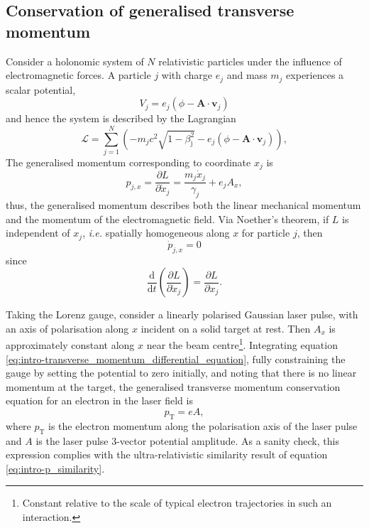 \subsection{Conservation of generalised transverse momentum}\label{sec:intro_conservation-generalised-mometum}
Consider a holonomic system of $N$ relativistic particles under the influence of electromagnetic forces. A particle $j$ with charge $e_j$ and mass $m_j$ experiences a scalar potential,
\begin{equation}
	V_{j} = e_j(\phi - \mathbf{A} \cdot \mathbf{v}_{j})
\end{equation}
and hence the system is described by the Lagrangian \cite{goldsteinClassicalMechanics2013}
\begin{equation}
	\mathcal{L} = \sum^N_{j=1}\left( - m_jc^2\sqrt{1-\beta^2_\mathrm{j}} - e_j(\phi - \mathbf{A} \cdot \mathbf{v}_j) \right),
\end{equation}
The generalised momentum corresponding to coordinate $x_j$ is
\begin{equation}
	p_{j,x} = \frac{\partial L}{\partial \dot{x}_j} = \frac{m_j\dot{x}_j }{\gamma_j}+ e_jA_x,
\end{equation}
thus, the generalised momentum describes both the linear mechanical momentum and the momentum of the electromagnetic field. Via Noether's theorem, if $L$ is independent of $x_j$, \textit{i.e.} spatially homogeneous along $x$ for particle $j$, then 
\begin{equation}\label{eq:intro-transverse_momentum_differential_equation}
	\dot{p}_{j,x} = 0
\end{equation}
since
\begin{equation}
	\frac{\mathrm{d}}{\mathrm{d}t}\left(\frac{\partial L}{\partial \dot{x}_j}\right) = \frac{\partial L}{\partial x_j}.
\end{equation}

Taking the Lorenz gauge, consider a linearly polarised Gaussian laser pulse, with an axis of polarisation along $x$ incident on a solid target at rest. Then $A_x$ is approximately constant along $x$ near the beam centre\footnote{Constant relative to the scale of typical electron trajectories in such an interaction.}. Integrating equation \ref{eq:intro-transverse_momentum_differential_equation}, fully constraining the gauge by setting the potential to zero initially, and noting that there is no linear momentum at the target, the generalised transverse momentum conservation equation for an electron in the laser field is
\begin{equation}\label{eq:intro-transverse_momentum_conservation_no_initial_momentum}
	p_\mathrm{T} = eA,
\end{equation}
where $p_\mathrm{T}$ is the electron momentum along the polarisation axis of the laser pulse and $A$ is the laser pulse 3-vector potential amplitude. As a sanity check, this expression complies with the ultra-relativistic similarity result of equation \ref{eq:intro-p_similarity}.


